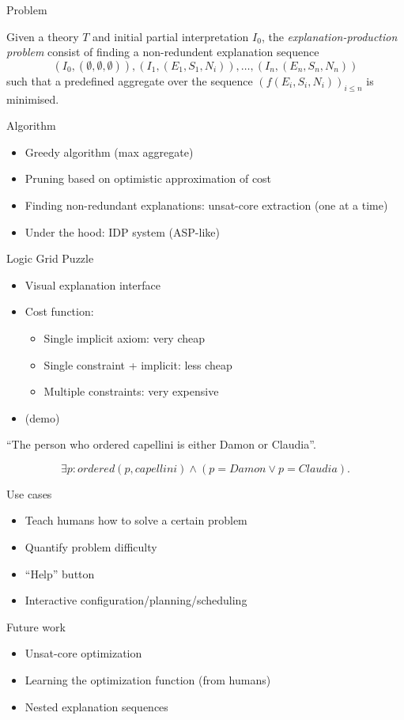 \documentclass[12pt]{beamer}
\begin{document}
\begin{frame}{Problem}
\begin{definition}
Given a theory $T$ and initial partial interpretation $I_0$, the \emph{explanation-production problem} consist of finding a non-redundent explanation sequence
\[(I_0,(\emptyset,\emptyset,\emptyset)), (I_1,(E_1,S_1,N_i)), \dots ,(I_n,(E_n,S_n,N_n))\]
such that a predefined aggregate over the sequence $\left(f(E_i,S_i,N_i)\right)_{i\leq n}$ is minimised.
\end{definition} 
\end{frame}


\begin{frame}{Algorithm}
 \begin{itemize}
  \item Greedy algorithm (max aggregate) 
  \item Pruning based on optimistic approximation of cost
  \item Finding non-redundant explanations: unsat-core extraction (one at a time) 
  \item Under the hood: IDP system (ASP-like) 
 \end{itemize}

\end{frame}

\begin{frame}{Logic Grid Puzzle}
\begin{itemize}
 \item Visual explanation interface
 \item Cost function: 
 \begin{itemize}
 \item Single implicit axiom: very cheap
 \item Single constraint + implicit: less cheap
 \item Multiple constraints: very expensive
 \end{itemize}
 \item (demo) 
\end{itemize}

 \centering 
``The person who ordered capellini is either Damon or Claudia''. 

\[\exists p: ordered(p,capellini)\land (p = Damon\lor p = Claudia).\]

\end{frame}

\begin{frame}{Use cases}
 \begin{itemize}
  \item Teach humans how to solve a certain problem
  \item Quantify problem difficulty
  \item ``Help'' button
  \item Interactive configuration/planning/scheduling
 \end{itemize}

\end{frame}

\begin{frame}{Future work}
\begin{itemize}
 \item Unsat-core optimization
 \item Learning the optimization function (from humans)
 \item Nested explanation sequences
\end{itemize}

 
\end{frame}
\end{document}
